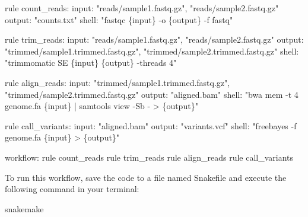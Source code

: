 \documentclass[
]{book}
\newenvironment{Shaded}{\begin{snugshade}}{\end{snugshade}}
\newcommand{\ExtensionTok}[1]{#1}
\newcommand{\NormalTok}[1]{#1}
\newcommand{\StringTok}[1]{\textcolor[rgb]{0.31,0.60,0.02}{#1}}
\begin{document}
\begin{Shaded}
\begin{Highlighting}[]
\ExtensionTok{rule}\NormalTok{ count\_reads:}
    \ExtensionTok{input:}
        \StringTok{"reads/sample1.fastq.gz"}\ExtensionTok{,}
        \StringTok{"reads/sample2.fastq.gz"}
    \ExtensionTok{output:}
        \StringTok{"counts.txt"}
    \ExtensionTok{shell:}
        \StringTok{"fastqc \{input\} {-}o \{output\} {-}f fastq"}

\ExtensionTok{rule}\NormalTok{ trim\_reads:}
    \ExtensionTok{input:}
        \StringTok{"reads/sample1.fastq.gz"}\ExtensionTok{,}
        \StringTok{"reads/sample2.fastq.gz"}
    \ExtensionTok{output:}
        \StringTok{"trimmed/sample1.trimmed.fastq.gz"}\ExtensionTok{,}
        \StringTok{"trimmed/sample2.trimmed.fastq.gz"}
    \ExtensionTok{shell:}
        \StringTok{"trimmomatic SE \{input\} \{output\} {-}threads 4"}

\ExtensionTok{rule}\NormalTok{ align\_reads:}
    \ExtensionTok{input:}
        \StringTok{"trimmed/sample1.trimmed.fastq.gz"}\ExtensionTok{,}
        \StringTok{"trimmed/sample2.trimmed.fastq.gz"}
    \ExtensionTok{output:}
        \StringTok{"aligned.bam"}
    \ExtensionTok{shell:}
        \StringTok{"bwa mem {-}t 4 genome.fa \{input\} | samtools view {-}Sb {-} \textgreater{} \{output\}"}

\ExtensionTok{rule}\NormalTok{ call\_variants:}
    \ExtensionTok{input:}
        \StringTok{"aligned.bam"}
    \ExtensionTok{output:}
        \StringTok{"variants.vcf"}
    \ExtensionTok{shell:}
        \StringTok{"freebayes {-}f genome.fa \{input\} \textgreater{} \{output\}"}

\ExtensionTok{workflow:}
    \ExtensionTok{rule}\NormalTok{ count\_reads}
    \ExtensionTok{rule}\NormalTok{ trim\_reads}
    \ExtensionTok{rule}\NormalTok{ align\_reads}
    \ExtensionTok{rule}\NormalTok{ call\_variants}
\end{Highlighting}
\end{Shaded}

\normalsize

To run this workflow, save the code to a file named Snakefile and execute the following command in your terminal:

\small

\begin{Shaded}
\begin{Highlighting}[]
\ExtensionTok{snakemake}
\end{Highlighting}
\end{Shaded}
\end{document}
